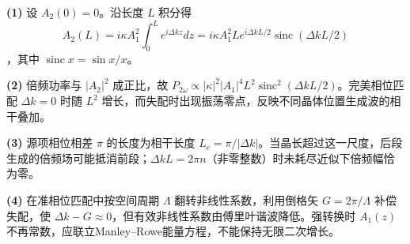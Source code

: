 \par\noindent\textbf{(1)} 设 \(A_2(0)=0\)。沿长度 \(L\) 积分得 \[A_2(L)=i\kappa A_1^2\int_0^L e^{i\Delta kz}dz=i\kappa A_1^2 L e^{i\Delta kL/2}\operatorname{sinc}(\Delta kL/2)\]，其中 \(\operatorname{sinc}x=\sin x/x\)。
\par\noindent\textbf{(2)} 倍频功率与 \(|A_2|^2\) 成正比，故 \(P_{2\omega}\propto|\kappa|^2|A_1|^4L^2\operatorname{sinc}^2(\Delta kL/2)\)。完美相位匹配 \(\Delta k=0\) 时随 \(L^2\) 增长，而失配时出现振荡零点，反映不同晶体位置生成波的相干叠加。
\par\noindent\textbf{(3)} 源项相位相差 \(\pi\) 的长度为相干长度 \(L_c=\pi/|\Delta k|\)。当晶长超过这一尺度，后段生成的倍频场可能抵消前段；\(\Delta kL=2\pi n\)（非零整数）时未耗尽近似下倍频幅恰为零。
\par\noindent\textbf{(4)} 在准相位匹配中按空间周期 \(\Lambda\) 翻转非线性系数，利用倒格矢 \(G=2\pi/\Lambda\) 补偿失配，使 \(\Delta k-G\approx0\)，但有效非线性系数由傅里叶谐波降低。强转换时 \(A_1(z)\) 不再常数，应联立Manley–Rowe能量方程，不能保持无限二次增长。
